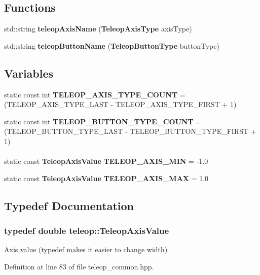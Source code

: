 \subsection*{Functions}
\begin{DoxyCompactItemize}
\item 
std::string {\bf teleopAxisName} ({\bf TeleopAxisType} axisType)
\item 
std::string {\bf teleopButtonName} ({\bf TeleopButtonType} buttonType)
\end{DoxyCompactItemize}
\subsection*{Variables}
\begin{DoxyCompactItemize}
\item 
static const int {\bf TELEOP\_\-AXIS\_\-TYPE\_\-COUNT} = (TELEOP\_\-AXIS\_\-TYPE\_\-LAST -\/ TELEOP\_\-AXIS\_\-TYPE\_\-FIRST + 1)
\item 
static const int {\bf TELEOP\_\-BUTTON\_\-TYPE\_\-COUNT} = (TELEOP\_\-BUTTON\_\-TYPE\_\-LAST -\/ TELEOP\_\-BUTTON\_\-TYPE\_\-FIRST + 1)
\end{DoxyCompactItemize}
\paragraph*{}
\begin{DoxyCompactItemize}
\item 
static const {\bf TeleopAxisValue} {\bf TELEOP\_\-AXIS\_\-MIN} = -\/1.0
\item 
static const {\bf TeleopAxisValue} {\bf TELEOP\_\-AXIS\_\-MAX} = 1.0
\end{DoxyCompactItemize}



\subsection{Typedef Documentation}
\subsubsection[{TeleopAxisValue}]{\setlength{\rightskip}{0pt plus 5cm}typedef double {\bf teleop::TeleopAxisValue}}\label{namespaceteleop_a76a980352ec9e25c22a88993b56e7085}
Axis value (typedef makes it easier to change width) 

Definition at line 83 of file teleop\_\-common.hpp.

